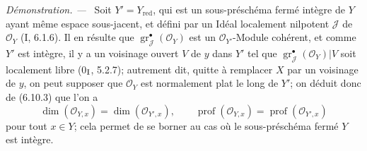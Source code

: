 \documentclass[10pt,oneside]{book}
\newcommand{\oldpage}[2][]{%
  \setcounter{footnote}{0}%
  \marginpar{\scriptsize\textbf{#1}~|~#2}\ignorespaces}
\newenvironment{proof}{%
  \par\medskip\noindent\textit{Démonstration. ---\ }}{\par}
\begin{document}
\begin{proof}
\oldpage[IV-2]{158}
Soit $Y'=Y_{\mathrm{red}}$, qui est un sous-préschéma fermé intègre de $Y$
ayant même espace sous-jacent, et défini par un Idéal localement nilpotent
$\mathcal J$ de $\mathcal O_Y$ (I, 6.1.6). Il en résulte que
$\operatorname{gr}_{\mathcal J}^{\bullet}(\mathcal O_Y)$ est un
$\mathcal O_{Y'}$-Module cohérent, et comme $Y'$ est intègre, il y a un
voisinage ouvert $V$ de $y$ dans $Y'$ tel que
$\operatorname{gr}_{\mathcal J}^{\bullet}(\mathcal O_Y)|V$ soit localement
libre (0$_{\rm I}$, 5.2.7); autrement dit, quitte à remplacer $X$ par un
voisinage de $y$, on peut supposer que $\mathcal O_Y$ est normalement plat
le long de $Y'$; on déduit donc de (6.10.3) que l'on a
\[
\dim(\mathcal O_{Y,x})=\dim(\mathcal O_{Y',x}),\qquad
\operatorname{prof}(\mathcal O_{Y,x})=
\operatorname{prof}(\mathcal O_{Y',x})
\]
pour tout $x\in Y$; cela permet de se borner au cas où le sous-préschéma
fermé $Y$ est intègre.


\end{proof}
\end{document}
